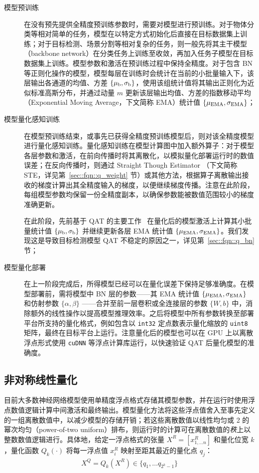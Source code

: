 \begin{description}
  \item[模型预训练] 在没有预先提供全精度预训练参数时，需要对模型进行预训练。对于物体分类等相对简单的任务，模型在以特定方式初始化后直接在目标数据集上训练；对于目标检测、场景分割等相对复杂的任务，则一般先将其主干模型（backbone network）在分类任务上训练至收敛，再加入任务子模型在目标数据集上训练。模型参数和激活在预训练过程中保持全精度。对于包含 BN 等正则化操作的模型，模型每层在训练时会统计在当前的小批量输入下，该层输出各通道的均值、方差 $\{{ \mu }_{\mathrm{b}}, { \sigma }_{\mathrm{b}}\}$，使用该组统计值将其输出正则化为近似标准高斯分布，并通过动量 $m$ 更新该层输出均值、方差的指数移动平均（Exponential Moving Average，下文简称 EMA）统计值 $\{{ \mu }_{\mathrm{EMA}}, { \sigma }_{\mathrm{EMA}}\}$；
  \item[模型量化感知训练] 在模型预训练结束，或事先已获得全精度预训练模型后，则对该全精度模型进行量化感知训练。量化感知训练在模型计算图中加入额外算子：对于模型各层参数和激活，在前向传播时将其离散化，以模拟量化部署运行时的数值误差；在反向传播时，则通过 Straight Though Estimator （下文简称 STE，详见第~\ref{sec::fqn::q_weight} 节）或其他方法，根据算子离散输出接收的梯度计算出其全精度输入的梯度，以便继续梯度传播。注意在此阶段，每组模型参数均保留一份全精度副本，以确保参数能被数值范围较小的梯度准确更新。
  
  在此阶段，先前基于 QAT 的主要工作~\citet{jacob2018quantization, krishnamoorthi2018quantizing} 在量化后的模型激活上计算其小批量统计值 $\{{ \mu }_{\mathrm{b}}, { \sigma }_{\mathrm{b}}\}$ 并继续更新各层 EMA 统计值 $\{{ \mu }_{\mathrm{EMA}}, { \sigma }_{\mathrm{EMA}}\}$。我们发现这是导致目标检测模型 QAT 不稳定的原因之一，详见第~\ref{sec::fqn::q_bn} 节；
  \item[模型量化部署] 在上一阶段完成后，所得模型已经可以在量化误差下保持足够准确度。在模型部署前，需将模型中 BN 层的参数——其 EMA 统计值 $\{{ \mu }_{\mathrm{EMA}}, { \sigma }_{\mathrm{EMA}}\}$ 和仿射参数 $\{\alpha, \beta\}$ ——合并至前一层卷积或全连接层的参数 $\{W, b\}$ 中，消除额外的线性操作以提高模型推理效率。之后将模型中所有参数转换至部署平台所支持的量化格式，例如包含以 \verb|int32| 定点数表示量化缩放的 \verb|uint8| 矩阵，最终在目标平台上运行。注意量化后的模型也可以在 GPU 上以离散浮点形式使用 \verb|cuDNN| 等浮点计算库运行，以快速验证 QAT 后量化模型的准确度。
\end{description}
\subsection{非对称线性量化} \label{sec::fqn::quant_scheme}
目前大多数神经网络模型使用单精度浮点格式存储其模型参数，并在运行时使用浮点数值逻辑计算中间激活和最终输出。模型量化方法将这些浮点值舍入至事先定义的一组离散数值中，以减少模型的存储开销；若这些离散数值以线性均匀或 2 的幂次均匀（power-of-two uniform）排布，则运行时的计算可在离散数值的\emph{秩}上以整数数值逻辑进行。具体地，给定一浮点格式的张量 $X^R = [x^R_{1, \ldots n}]$ 和量化位宽 $k$，量化函数 $Q_k(\cdot)$ 将每一浮点值 $x^R_i$ 映射至距其最近的量化点 $q_j$：
\begin{align}
  X^Q = Q_k(X^R) \in \{q_1, \ldots q_{2^k-1}\} 
\end{align}

